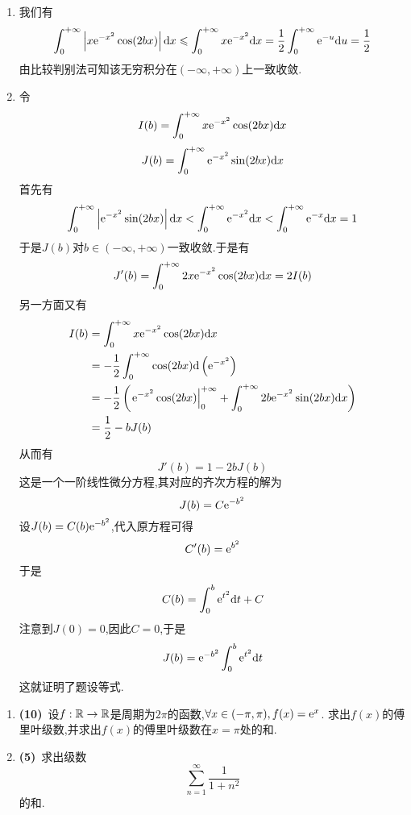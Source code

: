 \documentclass{ctexart}
\begin{document}
\begin{solution}
    \begin{enumerate}[label=\tbf{(\arabic*)},topsep=0pt,parsep=0pt,itemsep=0pt,partopsep=0pt]
        \item 我们有
            \[\int_0^{+\infty}\left|x\mathrm{e}^{-x^2}\cos(2bx)\right|\mathrm{d} x\leqslant\int_0^{+\infty}x\mathrm{e}^{-x^2}\mathrm{d} x=\dfrac{1}{2}\int_0^{+\infty}\mathrm{e}^{-u}\mathrm{d} u=\dfrac12\]
            由比较判别法可知该无穷积分在$(-\infty,+\infty)$上一致收敛.
        \item 令
            \[I(b)=\int_0^{+\infty}x\mathrm{e}^{-x^2}\cos(2bx)\mathrm{d} x\]
            \[J(b)=\int_0^{+\infty}\mathrm{e}^{-x^2}\sin(2bx)\mathrm{d} x\]
            首先有
            \[\int_0^{+\infty}\left|\mathrm{e}^{-x^2}\sin(2bx)\right|\mathrm{d} x
            <\int_0^{+\infty}\mathrm{e}^{-x^2}\mathrm{d} x<\int_0^{+\infty}\mathrm{e}^{-x}\mathrm{d} x=1\]
            于是$J(b)$对$b\in(-\infty,+\infty)$一致收敛.于是有
            \[J'(b)=\int_0^{+\infty}2x\mathrm{e}^{-x^2}\cos(2bx)\mathrm{d} x=2I(b)\]
            另一方面又有
            \[\begin{aligned}
                I(b)
                &= \int_0^{+\infty}x\mathrm{e}^{-x^2}\cos(2bx)\mathrm{d} x \\
                &= -\dfrac12\int_0^{+\infty}\cos(2bx)\mathrm{d}\left(\mathrm{e}^{-x^2}\right) \\
                &= -\dfrac12\left(\left.\mathrm{e}^{-x^2}\cos(2bx)\right|_0^{+\infty}+\int_0^{+\infty}2b\mathrm{e}^{-x^2}\sin(2bx)\mathrm{d} x\right) \\
                &= \dfrac12-bJ(b)
            \end{aligned}\]
            从而有
            \[J'(b)=1-2bJ(b)\]
            这是一个一阶线性微分方程,其对应的齐次方程的解为
            \[J(b)=C\mathrm{e}^{-b^2}\]
            设$J(b)=C(b)\mathrm{e}^{-b^2}$,代入原方程可得
            \[C'(b)=\mathrm{e}^{b^2}\]
            于是
            \[C(b)=\int_0^{b}\mathrm{e}^{t^2}\mathrm{d} t+C\]
            注意到$J(0)=0$,因此$C=0$,于是
            \[J(b)=\mathrm{e}^{-b^2}\int_0^{b}\mathrm{e}^{t^2}\mathrm{d} t\]
            这就证明了题设等式.
    \end{enumerate}
\end{solution}
\begin{problem}[8.(15\songti{分})]
    \begin{enumerate}[label=\tbf{(\arabic*)},topsep=0pt,parsep=0pt,itemsep=0pt,partopsep=0pt]
        \item \textbf{(10)}\ 设$f:\mathbb{R}\to\mathbb{R}$是周期为$2\pi$的函数,$\forall x\in(-\pi,\pi),f(x)=\mathrm{e}^x$.%
            求出$f(x)$的傅里叶级数,并求出$f(x)$的傅里叶级数在$x=\pi$处的和.
        \item \textbf{(5)}\ 求出级数
            \[\sum_{n=1}^{\infty}\dfrac{1}{1+n^2}\]
            的和.
    \end{enumerate}

\end{problem}
\end{document}

